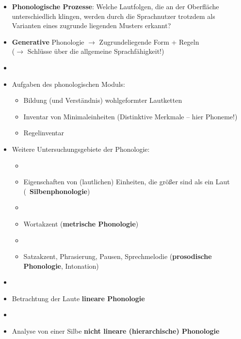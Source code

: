
\begin{frame}

\begin{itemize}
	\item \textbf{Phonologische Prozesse}: Welche Lautfolgen, die an der Oberfläche unterschiedlich klingen, werden durch die Sprachnutzer trotzdem als Varianten eines zugrunde liegenden Musters erkannt?

\ea \textipa{[ga{\textscr}t@n]} \vs 
\textipa{[ga:d\textsyllabic{n}]}
\z

\item \textbf{Generative} Phonologie $\rightarrow$ Zugrundeliegende Form +  Regeln\\
      ($\rightarrow$ Schlüsse über die allgemeine Sprachfähigkeit!) 
	\item[]
	\item Aufgaben des phonologischen Moduls:
	
	\begin{itemize}
		\item Bildung (und Verständnis) wohlgeformter Lautketten
		\item Inventar von Minimaleinheiten (Distinktive Merkmale -- hier Phoneme!)
		\item Regelinventar
	\end{itemize}
	 
\end{itemize}

\end{frame}




\begin{frame}

\begin{itemize}
	\item Weitere Untersuchungsgebiete der Phonologie:
	
	\begin{itemize}
		\item[]
		\item Eigenschaften von (lautlichen) Einheiten, die größer sind als ein Laut (\zB~\textbf{Silbenphonologie})
		\item[]
		\item Wortakzent (\textbf{metrische Phonologie})
		\item[]
		\item Satzakzent, Phrasierung, Pausen, Sprechmelodie (\textbf{prosodische Phonologie}, Intonation)
	\end{itemize}
	
	\item[]
	\item Betrachtung der Laute \ras \textbf{lineare Phonologie}
	\item[]
	\item Analyse von einer Silbe \ras \textbf{nicht lineare (hierarchische) Phonologie}
\end{itemize}

\end{frame}



